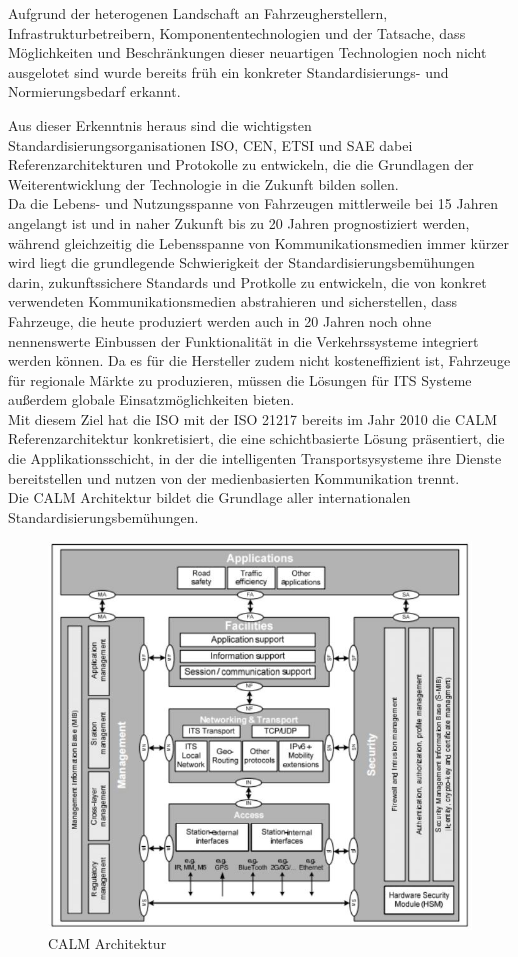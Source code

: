     Aufgrund der heterogenen Landschaft an Fahrzeugherstellern, Infrastrukturbetreibern, Komponententechnologien und der Tatsache, dass Möglichkeiten
    und Beschränkungen dieser neuartigen Technologien noch nicht ausgelotet sind wurde bereits früh ein konkreter Standardisierungs- und Normierungsbedarf erkannt.

    Aus dieser Erkenntnis heraus sind die wichtigsten Standardisierungsorganisationen ISO, CEN, ETSI und SAE dabei Referenzarchitekturen und Protokolle zu entwickeln, die
    die Grundlagen der Weiterentwicklung der Technologie in die Zukunft bilden sollen.\cite{BP11}\\
    Da die Lebens- und Nutzungsspanne von Fahrzeugen mittlerweile bei 15 Jahren angelangt ist und in naher Zukunft bis zu 20 Jahren prognostiziert werden, während gleichzeitig die 
    Lebensspanne von Kommunikationsmedien immer kürzer wird liegt die grundlegende Schwierigkeit der Standardisierungsbemühungen darin, zukunftssichere Standards und Protkolle zu entwickeln,
    die von konkret verwendeten Kommunikationsmedien abstrahieren und sicherstellen, dass Fahrzeuge, die heute produziert werden auch in 20 Jahren noch ohne nennenswerte Einbussen der Funktionalität in die Verkehrssysteme
    integriert werden können. Da es für die Hersteller zudem nicht kosteneffizient ist, Fahrzeuge für regionale Märkte zu produzieren, müssen die Lösungen für ITS Systeme
    außerdem globale Einsatzmöglichkeiten bieten.\\
    Mit diesem Ziel hat die ISO mit der ISO 21217 \cite{BP09} bereits im Jahr 2010 die CALM Referenzarchitektur konkretisiert, die eine schichtbasierte Lösung präsentiert, die die Applikationsschicht, in
    der die intelligenten Transportsysysteme ihre Dienste bereitstellen und nutzen von der medienbasierten Kommunikation trennt.\\
    Die CALM Architektur bildet die Grundlage aller internationalen Standardisierungsbemühungen.

       
    \begin{figure}[h!]
        \begin{center}
        \includegraphics[width=0.7\linewidth]{./images/BP/CALM2.jpg}
        \caption[www.researchgate.net/figure/ETSI-ITS-G5-Architecture-from-15\textunderscore fig3]{CALM Architektur}
        \label{fig:CALM}
    \end{center}
    \end{figure}

